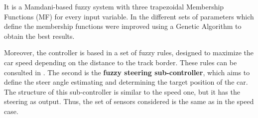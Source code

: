 \documentclass[conference]{IEEEtran}
\begin{document}
It is a Mamdani-based fuzzy system \cite{iancu2012} with three
trapezoidal Membership Functions (MF) for every input variable. 
In \cite{salem_evo18} the different sets of parameters which define the membership functions were improved using a Genetic Algorithm to obtain the best results.

Moreover, the controller is based in a set of fuzzy rules, designed to
maximize the car speed depending on the distance to the track
border. These rules can be consulted in \cite{salem_evo17}.
%
%
%
%
%
%
%
The second is the \textbf{fuzzy steering sub-controller}, which aims to define the steer angle estimating and determining the target position of the car. 
%
The structure of this sub-controller is similar to the speed one, but it has the steering as output. Thus, the set of sensors considered is the same as in the speed case.
\end{document}
